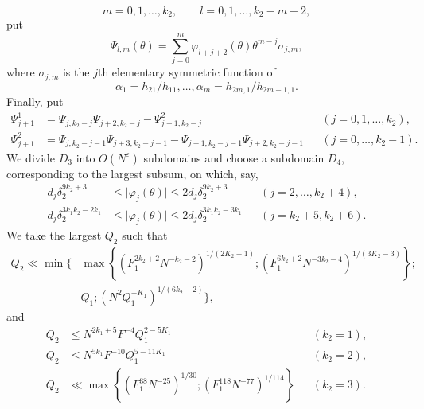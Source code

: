 \documentclass[10pt]{article}
\begin{document}
\[
  m=0,1,\ldots,k_2,
  \qquad l=0,1,\ldots,k_2-m+2,
\]
put
\[
  \Psi_{l,m}(\theta)=\sum_{j=0}^m
  \varphi_{l+j+2}(\theta)\theta^{m-j}\sigma_{j,m},
\]
where $\sigma_{j,m}$ is the $j$th elementary symmetric function of
\[
  \alpha_1=h_{21}/h_{11},\ldots,
  \alpha_m=h_{2m,1}/h_{2m-1,1}.
\]
Finally, put
\[
\begin{aligned}
 \Psi_{j+1}^1
 &=\Psi_{j,k_2-j}\Psi_{j+2,k_2-j}
   -\Psi_{j+1,k_2-j}^2
 &&(j=0,1,\ldots,k_2),\\
 \Psi_{j+1}^2
 &=\Psi_{j,k_2-j-1}\Psi_{j+3,k_2-j-1}
   -\Psi_{j+1,k_2-j-1}\Psi_{j+2,k_2-j-1}
 &&(j=0,\ldots,k_2-1).
\end{aligned}
\]
We divide $D_3$ into $O(N^\varepsilon)$ subdomains and choose a subdomain $D_4$, corresponding to the largest subsum, on which, say,
\[
\begin{aligned}
 d_j\delta_2^{9k_2+3}
 &\leqslant\lvert\varphi_j(\theta)\rvert
 \leqslant2d_j\delta_2^{9k_2+3}
 &&(j=2,\ldots,k_2+4),\\
 d_j\delta_2^{3k_1k_2-2k_1}
 &\leqslant\lvert\varphi_j(\theta)\rvert
 \leqslant2d_j\delta_2^{3k_1k_2-3k_1}
 &&(j=k_2+5,k_2+6).
\end{aligned}
\]
We take the largest $Q_2$ such that
\[
\begin{aligned}
Q_2\ll\min\Bigg\{&
 \max\left\{
  (F_1^{2k_2+2}N^{-k_2-2})^{1/(2K_2-1)};
  (F_1^{6k_2+2}N^{-3k_2-4})^{1/(3K_2-3)}
 \right\};\\
&Q_1;
 (N^2Q_1^{-K_1})^{1/(6k_2-2)}
\Bigg\},
\end{aligned}
\]
and
\[
\begin{aligned}
 Q_2&\leqslant N^{2k_1+5}F^{-4}Q_1^{2-5K_1}
 &&(k_2=1),\\
 Q_2&\leqslant N^{5k_1}F^{-10}Q_1^{5-11K_1}
 &&(k_2=2),\\
 Q_2&\ll\max\left\{
 (F_1^{38}N^{-25})^{1/30};
 (F_1^{118}N^{-77})^{1/114}
 \right\}
 &&(k_2=3).
\end{aligned}
\]
\end{document}
